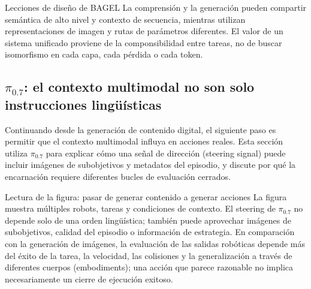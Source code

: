\begin{importantbox}{Lecciones de diseño de BAGEL}
La comprensión y la generación pueden compartir semántica de alto nivel y contexto de secuencia, mientras utilizan representaciones de imagen y rutas de parámetros diferentes. El valor de un sistema unificado proviene de la componsibilidad entre tareas, no de buscar isomorfismo en cada capa, cada pérdida o cada token.
\end{importantbox}


\subsection{\texorpdfstring{$\pi_{0.7}$}{pi0.7}: el contexto multimodal no son solo instrucciones lingüísticas}

Continuando desde la generación de contenido digital, el siguiente paso es permitir que el contexto multimodal influya en acciones reales. Esta sección utiliza $\pi_{0.7}$ para explicar cómo una señal de dirección (steering signal) puede incluir imágenes de subobjetivos y metadatos del episodio, y discute por qué la encarnación requiere diferentes bucles de evaluación cerrados.


\begin{knowledgebox}{Lectura de la figura: pasar de generar contenido a generar acciones}
La figura muestra múltiples robots, tareas y condiciones de contexto. El steering de $\pi_{0.7}$ no depende solo de una orden lingüística; también puede aprovechar imágenes de subobjetivos, calidad del episodio o información de estrategia. En comparación con la generación de imágenes, la evaluación de las salidas robóticas depende más del éxito de la tarea, la velocidad, las colisiones y la generalización a través de diferentes cuerpos (embodiments); una acción que parece razonable no implica necesariamente un cierre de ejecución exitoso.
\end{knowledgebox}


